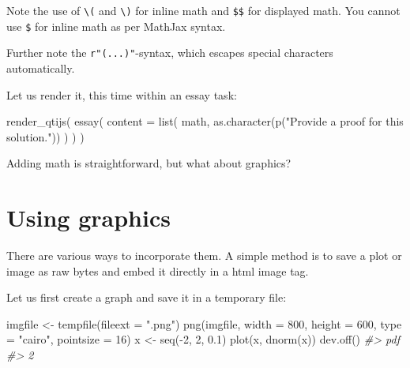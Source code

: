 \documentclass[twoside]{tufte-book}
\newenvironment{Shaded}{}{}
\newcommand{\AttributeTok}[1]{\textcolor[rgb]{0.49,0.56,0.16}{#1}}
\newcommand{\CommentTok}[1]{\textcolor[rgb]{0.38,0.63,0.69}{\textit{#1}}}
\newcommand{\DecValTok}[1]{\textcolor[rgb]{0.25,0.63,0.44}{#1}}
\newcommand{\FloatTok}[1]{\textcolor[rgb]{0.25,0.63,0.44}{#1}}
\newcommand{\FunctionTok}[1]{\textcolor[rgb]{0.02,0.16,0.49}{#1}}
\newcommand{\NormalTok}[1]{#1}
\newcommand{\OtherTok}[1]{\textcolor[rgb]{0.00,0.44,0.13}{#1}}
\newcommand{\SpecialCharTok}[1]{\textcolor[rgb]{0.25,0.44,0.63}{#1}}
\newcommand{\StringTok}[1]{\textcolor[rgb]{0.25,0.44,0.63}{#1}}
\begin{document}
Note the use of \texttt{\textbackslash{}(} and \texttt{\textbackslash{})} for inline math and \texttt{\$\$} for displayed math. You cannot use \texttt{\$} for inline math as per MathJax syntax.

Further note the \texttt{r"(...)"}-syntax, which escapes special characters automatically.

Let us render it, this time within an essay task:

\begin{Shaded}
\begin{Highlighting}[]
\FunctionTok{render\_qtijs}\NormalTok{(}
  \FunctionTok{essay}\NormalTok{(}
    \AttributeTok{content =} \FunctionTok{list}\NormalTok{(}
\NormalTok{      math, }
      \FunctionTok{as.character}\NormalTok{(}\FunctionTok{p}\NormalTok{(}\StringTok{"Provide a proof for this solution."}\NormalTok{))}
\NormalTok{    )}
\NormalTok{  )}
\NormalTok{)}
\end{Highlighting}
\end{Shaded}

Adding math is straightforward, but what about graphics?

\section{Using graphics}\label{using-graphics}

There are various ways to incorporate them. A simple method is to save a plot or image as raw bytes and embed it directly in a html image tag.

Let us first create a graph and save it in a temporary file:

\begin{Shaded}
\begin{Highlighting}[]
\NormalTok{imgfile }\OtherTok{\textless{}{-}} \FunctionTok{tempfile}\NormalTok{(}\AttributeTok{fileext =} \StringTok{".png"}\NormalTok{)}
\FunctionTok{png}\NormalTok{(imgfile, }\AttributeTok{width =} \DecValTok{800}\NormalTok{, }\AttributeTok{height =} \DecValTok{600}\NormalTok{, }\AttributeTok{type =} \StringTok{"cairo"}\NormalTok{, }\AttributeTok{pointsize =} \DecValTok{16}\NormalTok{)}
\NormalTok{x }\OtherTok{\textless{}{-}} \FunctionTok{seq}\NormalTok{(}\SpecialCharTok{{-}}\DecValTok{2}\NormalTok{, }\DecValTok{2}\NormalTok{, }\FloatTok{0.1}\NormalTok{)}
\FunctionTok{plot}\NormalTok{(x, }\FunctionTok{dnorm}\NormalTok{(x))}
\FunctionTok{dev.off}\NormalTok{()}
\CommentTok{\#\textgreater{} pdf }
\CommentTok{\#\textgreater{}   2}
\end{Highlighting}
\end{Shaded}
\end{document}
